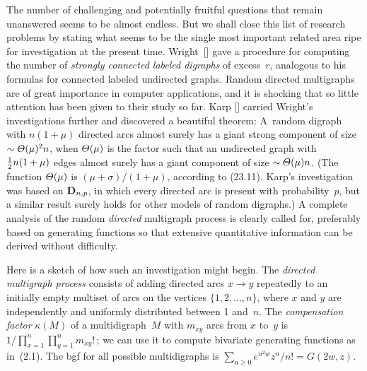 The number of challenging and potentially fruitful questions that remain
unanswered seems to be almost endless. But we shall close this list
of research problems by stating what seems to be the single most important
related area ripe for investigation at the present time. Wright~[\Wsii]
gave a procedure for computing the number of {\it strongly connected
labeled digraphs\/} of excess~$r$, analogous to his formulas for connected
labeled undirected graphs.
Random directed multigraphs are of great importance in computer applications,
and it is shocking that so little attention has been given to
their study so far. Karp [\Kar] carried Wright's investigations further
and discovered a beautiful theorem:
A~random digraph with $n(1+\mu)$ directed arcs almost surely
has a giant strong component of size $\sim {\mit\Theta}(\mu)^2n$,
when ${\mit\Theta}(\mu)$ is the factor such that
an undirected graph with ${1\over2} n(1+\mu)$ edges almost surely
has a giant component of size $\sim{\mit\Theta}(\mu)n$.
(The function ${\mit\Theta}(\mu)$ is $(\mu+\sigma)/(1+\mu)$,
according to (23.11). Karp's investigation was based on ${\bf D}_{n,p}$,
in which every directed arc is present with probability~$p$, but a
similar result surely holds for other models of random digraphs.)
A complete analysis of the random {\it directed\/} multigraph process
is clearly called for, preferably based on generating functions
so that extensive quantitative information can be derived without
difficulty.

Here is a sketch of how such an investigation might begin.
The {\it directed multigraph process\/} consists of adding directed
arcs $x\to y$ repeatedly to an initially empty multiset of arcs
on the vertices $\{1,2,\ldots,n\}$, where $x$ and $y$ are independently
and uniformly distributed between 1 and~$n$. The {\it compensation
factor} $\kappa(M)$ of a multidigraph~$M$ with $m_{xy}$ arcs from
$x$ to~$y$ is $1\big/\prod_{x=1}^n\prod_{y=1}^n m_{xy}!\,$; we can use it to
compute bivariate generating functions as in~(2.1). The bgf for all
possible multidigraphs is $\sum_{n\ge0}e^{n^2w}z^n\!/n!=G(2w,z)$.

